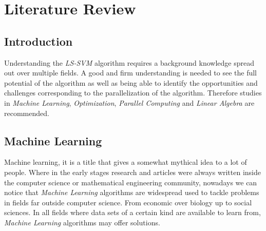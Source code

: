 
\chapter{Literature Review}

\section{Introduction}
Understanding the \textit{LS-SVM} algorithm requires a background knowledge spread out over multiple fields.
A good and firm understanding is needed to see the full potential of the algorithm as well as being able to identify the opportunities and challenges corresponding to the parallelization of the algorithm.
Therefore studies in \textit{Machine Learning}, \textit{Optimization}, \textit{Parallel Computing} and \textit{Linear Algebra} are recommended.
 
\section{Machine Learning}
Machine learning, it is a title that gives a somewhat mythical idea to a lot of people.
Where in the early stages research and articles were always written inside the computer science or mathematical engineering community, 
nowadays we can notice that \textit{Machine Learning} algorithms are widespread used to tackle problems in fields far outside computer science.
From economic over biology up to social sciences.
In all fields where data sets of a certain kind are available to learn from, \textit{Machine Learning} algorithms may offer solutions.

